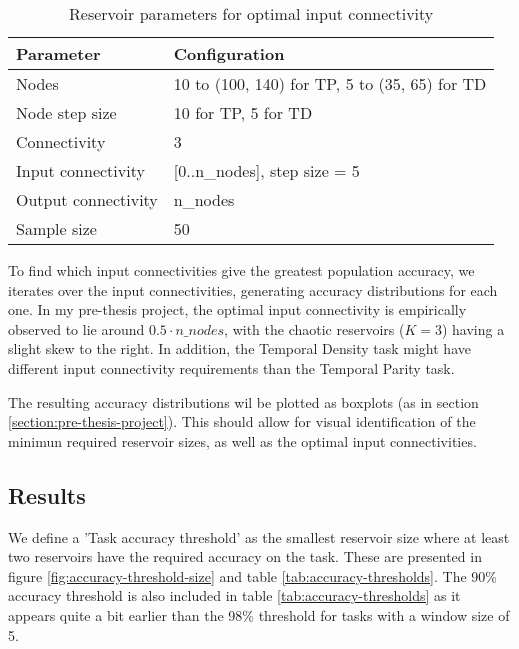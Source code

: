 \begin{table}[ht]
    \centering
    \caption{Reservoir parameters for optimal input connectivity}
    \label{tab:ic-reservoir-parameters}
    \begin{tabular}{ll}
        \hline
        \textbf{Parameter} & \textbf{Configuration} \\
        \hline
        \hline
        Nodes               & 10 to (100, 140) for TP, 5 to (35, 65) for TD \\
        Node step size      & 10 for TP, 5 for TD \\
        Connectivity        & 3                              \\
        Input connectivity  & [0..n\_nodes], step size = 5   \\
        Output connectivity & n\_nodes                       \\
        Sample size         & 50 \\
        \hline
    \end{tabular}
\end{table}

To find which input connectivities give the greatest population accuracy,
we iterates over the input connectivities, generating accuracy distributions for each one.
In my pre-thesis project,
the optimal input connectivity is empirically observed to lie around $ 0.5 \cdot n\_nodes $,
with the chaotic reservoirs ($K=3$) having a slight skew to the right.
In addition,
the Temporal Density task might have different input connectivity requirements than the Temporal Parity task.

The resulting accuracy distributions wil be plotted as boxplots (as in section \ref{section:pre-thesis-project}).
This should allow for visual identification of the minimun required reservoir sizes,
as well as the optimal input connectivities.

\subsection{Results}
\label{subsection:reservoir_size-input_connectivity:results}

We define a 'Task accuracy threshold' as the smallest reservoir size where at least two reservoirs have the required accuracy on the task.
These are presented in figure \ref{fig:accuracy-threshold-size} and table \ref{tab:accuracy-thresholds}.
The 90\% accuracy threshold is also included in table \ref{tab:accuracy-thresholds} as it appears quite a bit earlier than the 98\% threshold for tasks with a window size of 5.

